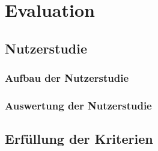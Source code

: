 
\chapter{Evaluation}
\label{chapter:evaluation}

\section{Nutzerstudie}

\subsection{Aufbau der Nutzerstudie}



\subsection{Auswertung der Nutzerstudie}



\section{Erfüllung der Kriterien}



